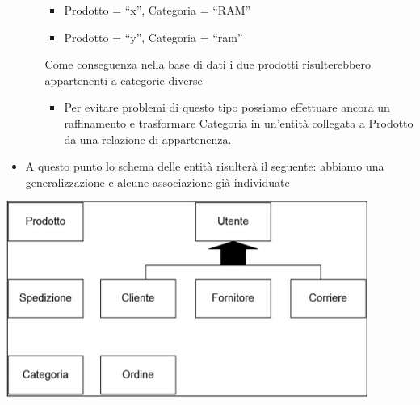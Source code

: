 \begin{itemize}
\begin{enumerate}
		\begin{itemize}
			\item Prodotto = “x”, Categoria = “RAM” 
			\item Prodotto = “y”, Categoria = “ram”
		\end{itemize}
		Come conseguenza nella base di dati i due prodotti risulterebbero appartenenti a categorie diverse
		\begin{itemize}
			\item Per evitare problemi di questo tipo possiamo effettuare ancora un raffinamento e trasformare Categoria in un’entità collegata a Prodotto da una relazione di appartenenza.
		\end{itemize}
	\end{enumerate}
	\item A questo punto lo schema delle entità risulterà il seguente: abbiamo una generalizzazione e alcune associazione già individuate
\end{itemize}
\begin{center}
	\includegraphics{images/87.PNG}
\end{center}
